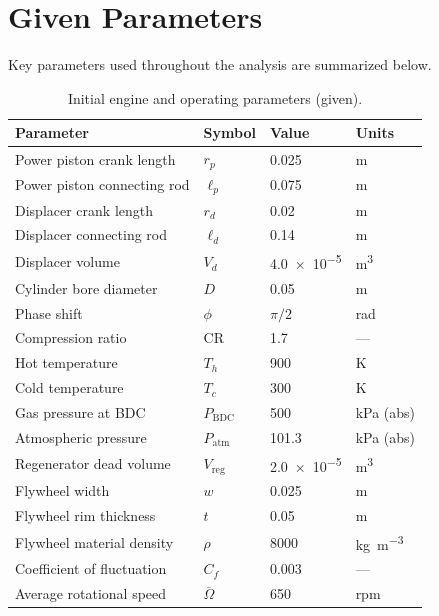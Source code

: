 \documentclass[12pt]{article}
\begin{document}
\section{Given Parameters}
Key parameters used throughout the analysis are summarized below.
\begin{table}[H]
  \centering
  \caption{Initial engine and operating parameters (given).}
  \label{tab:params}
  \begin{tabular}{@{}llll@{}}
    \toprule
    \textbf{Parameter} & \textbf{Symbol} & \textbf{Value} & \textbf{Units} \\
    \midrule
    Power piston crank length & $r_{p}$ & \num{0.025} & \si{\meter} \\
    Power piston connecting rod & $\ell_{p}$ & \num{0.075} & \si{\meter} \\
    Displacer crank length & $r_{d}$ & \num{0.02} & \si{\meter} \\
    Displacer connecting rod & $\ell_{d}$ & \num{0.14} & \si{\meter} \\
    Displacer volume & $V_{d}$ & \num{4.0e-5} & \si{\meter\cubed} \\
    Cylinder bore diameter & $D$ & \num{0.05} & \si{\meter} \\
    Phase shift & $\phi$ & $\pi/2$ & \si{\radian} \\
    Compression ratio & $\mathrm{CR}$ & \num{1.7} & --- \\
    Hot temperature & $T_{h}$ & \num{900} & \si{\kelvin} \\
    Cold temperature & $T_{c}$ & \num{300} & \si{\kelvin} \\
    Gas pressure at BDC & $P_{\mathrm{BDC}}$ & \num{500} & \si{\kilo\pascal} (abs) \\
    Atmospheric pressure & $P_{\mathrm{atm}}$ & \num{101.3} & \si{\kilo\pascal} (abs) \\
    Regenerator dead volume & $V_{\mathrm{reg}}$ & \num{2.0e-5} & \si{\meter\cubed} \\
    Flywheel width & $w$ & \num{0.025} & \si{\meter} \\
    Flywheel rim thickness & $t$ & \num{0.05} & \si{\meter} \\
    Flywheel material density & $\rho$ & \num{8000} & \si{\kilo\gram\per\meter\cubed} \\
    Coefficient of fluctuation & $C_{f}$ & \num{0.003} & --- \\
    Average rotational speed & $\overline{\Omega}$ & \num{650} & \si{rpm} \\
    \bottomrule
  \end{tabular}
\end{table}
\end{document}

